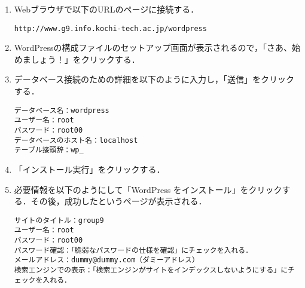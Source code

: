 \documentclass[a4j,titlepage]{jarticle}
\begin{document}
\begin{itemize}
\begin{enumerate}
\begin{enumerate}
\item Webブラウザで以下のURLのページに接続する．
\begin{screen}
\begin{center}
\begin{verbatim}
http://www.g9.info.kochi-tech.ac.jp/wordpress
\end{verbatim}
\end{center}
\end{screen}

\item WordPressの構成ファイルのセットアップ画面が表示されるので，「さあ、始めましょう！」をクリックする．

\item データベース接続のための詳細を以下のように入力し，「送信」をクリックする．
\begin{screen}
\begin{center}
\begin{verbatim}
データベース名：wordpress
ユーザー名：root
パスワード：root00
データベースのホスト名：localhost
テーブル接頭辞：wp_
\end{verbatim}
\end{center}
\end{screen}

\item 「インストール実行」をクリックする．

\item 必要情報を以下のようにして「WordPress をインストール」をクリックする．その後，成功したというページが表示される．
\begin{screen}
\begin{center}
\begin{verbatim}
サイトのタイトル：group9
ユーザー名：root
パスワード：root00
パスワード確認：「脆弱なパスワードの仕様を確認」にチェックを入れる．
メールアドレス：dummy@dummy.com（ダミーアドレス）
検索エンジンでの表示：「検索エンジンがサイトをインデックスしないようにする」にチェックを入れる．
\end{verbatim}
\end{center}
\end{screen}

\end{enumerate}


\end{enumerate}
\end{itemize}
\end{document}

